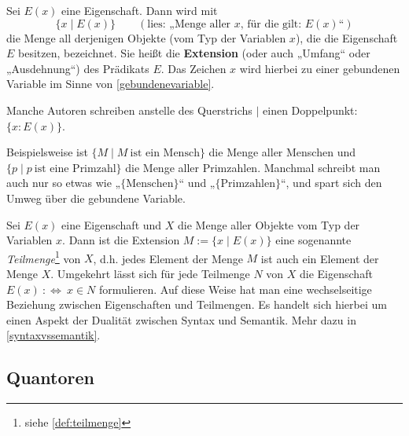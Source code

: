 \begin{nota} \label{extensionimlogikkapitel}
    Sei $E(x)$ eine Eigenschaft. Dann wird mit
        \[ \{ x\mid E(x) \} \qquad (\text{lies: „Menge aller $x$, für die gilt: $E(x)$“})\]
    die Menge all derjenigen Objekte (vom Typ der Variablen $x$), die die Eigenschaft $E$ besitzen, bezeichnet. Sie heißt die \textbf{Extension} (oder auch „Umfang“ oder „Ausdehnung“) des Prädikats $E$. Das Zeichen $x$ wird hierbei zu einer gebundenen Variable im Sinne von \cref{gebundenevariable}.

    Manche Autoren schreiben anstelle des Querstrichs $\vert$ einen Doppelpunkt: $\{x: E(x) \}$.
\end{nota}


\begin{bsp}
    Beispielsweise ist $\{M\mid M\ \text{ist ein Mensch}\}$ die Menge aller Menschen und $\{p\mid p\ \text{ist eine Primzahl}\}$ die Menge aller Primzahlen. Manchmal schreibt man auch nur so etwas wie „$\{\text{Menschen}\}$“ und „$\{\text{Primzahlen}\}$“, und spart sich den Umweg über die gebundene Variable.
\end{bsp}


\begin{vorschau} \label{mengenvseig}
    Sei $E(x)$ eine Eigenschaft und $X$ die Menge aller Objekte vom Typ der Variablen $x$. Dann ist die Extension $M:=\{x\mid E(x)\}$ eine sogenannte \emph{Teilmenge}\footnote{siehe \cref{def:teilmenge}} von $X$, d.h. jedes Element der Menge $M$ ist auch ein Element der Menge $X$. Umgekehrt lässt sich für jede Teilmenge $N$ von $X$ die Eigenschaft $E(x)\ :\Leftrightarrow\ x\in N$ formulieren. Auf diese Weise hat man eine wechselseitige Beziehung zwischen Eigenschaften und Teilmengen. Es handelt sich hierbei um einen Aspekt der Dualität zwischen Syntax und Semantik. Mehr dazu in \cref{syntaxvssemantik}.
\end{vorschau}





\subsection*{Quantoren}


